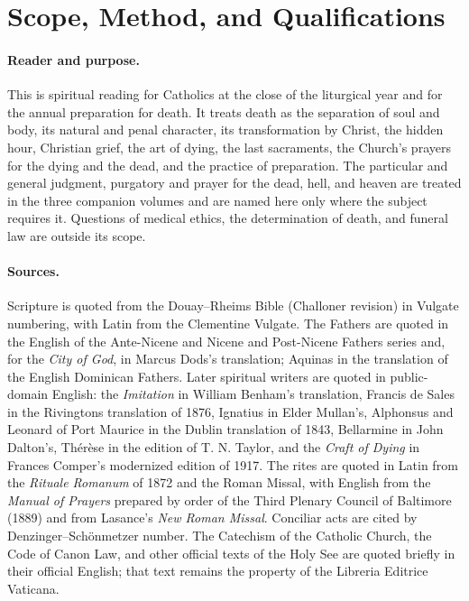 \section{Scope, Method, and Qualifications}

\paragraph{Reader and purpose.} This is spiritual reading for Catholics at the close of the liturgical year and for the annual preparation for death. It treats death as the separation of soul and body, its natural and penal character, its transformation by Christ, the hidden hour, Christian grief, the art of dying, the last sacraments, the Church's prayers for the dying and the dead, and the practice of preparation. The particular and general judgment, purgatory and prayer for the dead, hell, and heaven are treated in the three companion volumes and are named here only where the subject requires it. Questions of medical ethics, the determination of death, and funeral law are outside its scope.

\paragraph{Sources.} Scripture is quoted from the Douay--Rheims Bible (Challoner revision) in Vulgate numbering, with Latin from the Clementine Vulgate. The Fathers are quoted in the English of the Ante-Nicene and Nicene and Post-Nicene Fathers series and, for the \emph{City of God}, in Marcus Dods's translation; Aquinas in the translation of the English Dominican Fathers. Later spiritual writers are quoted in public-domain English: the \emph{Imitation} in William Benham's translation, Francis de Sales in the Rivingtons translation of 1876, Ignatius in Elder Mullan's, Alphonsus and Leonard of Port Maurice in the Dublin translation of 1843, Bellarmine in John Dalton's, Th\'er\`ese in the edition of T. N. Taylor, and the \emph{Craft of Dying} in Frances Comper's modernized edition of 1917. The rites are quoted in Latin from the \emph{Rituale Romanum} of 1872 and the Roman Missal, with English from the \emph{Manual of Prayers} prepared by order of the Third Plenary Council of Baltimore (1889) and from Lasance's \emph{New Roman Missal}. Conciliar acts are cited by Denzinger--Sch\"onmetzer number. The Catechism of the Catholic Church, the Code of Canon Law, and other official texts of the Holy See are quoted briefly in their official English; that text remains the property of the Libreria Editrice Vaticana.


